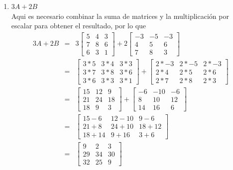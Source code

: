 \documentclass[12pt]{article}
\begin{document}
\begin{enumerate}
\begin{enumerate}
\begin{enumerate}
			\item $3A + 2B$ \\ Aqui es necesario combinar la suma de matrices y la multiplicaci\'on por escalar para obtener el resultado, por lo que
				\begin{eqnarray*}
					3A + 2B &=& 3\begin{bmatrix}
									5 & 4 & 3 \\
									7 & 8 & 6 \\
									6 & 3 & 1
								\end{bmatrix} + 2\begin{bmatrix}
									-3&-5 &-3 \\
									4 & 5 & 6 \\
									7 & 8 & 3
								\end{bmatrix} \\
					&=&	\begin{bmatrix}
							3*5 & 3*4 & 3*3 \\
							3*7 & 3*8 & 3*6 \\
							3*6 & 3*3 & 3*1
						\end{bmatrix} + \begin{bmatrix}
							2*-3& 2*-5& 2*-3 \\
							2*4 & 2*5 & 2*6 \\
							2*7 & 2*8 & 2*3
						\end{bmatrix} \\
					&=& \begin{bmatrix}
							15 & 12 &  9 \\
							21 & 24 & 18 \\
							18 &  9 &  3
						\end{bmatrix} + \begin{bmatrix}
							 -6 &-10 & -6 \\
							  8 & 10 & 12 \\
							 14 & 16 & 6
						\end{bmatrix} \\
					&=& \begin{bmatrix}
							15- 6 & 12-10 &  9- 6 \\
							21+ 8 & 24+10 & 18+12 \\
							18+14 &  9+16 &  3+ 6
						\end{bmatrix} \\
					&=& \begin{bmatrix}
							 9 &  2 &  3 \\
							29 & 34 & 30 \\
							32 & 25 &  9
						\end{bmatrix}
				\end{eqnarray*}
		\end{enumerate}
	\end{enumerate}


\end{enumerate}
\end{document}
